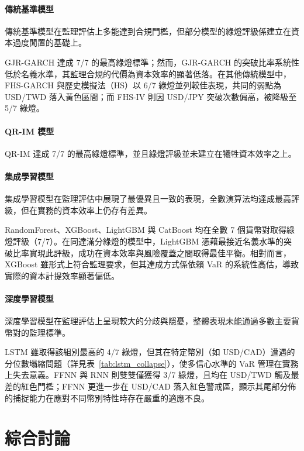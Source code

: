 \paragraph{傳統基準模型}

傳統基準模型在監理評估上多能達到合規門檻，但部分模型的綠燈評級係建立在資本過度閒置的基礎上。

GJR-GARCH 達成 7/7 的最高綠燈標準；然而，GJR-GARCH 的突破比率系統性低於名義水準，其監理合規的代價為資本效率的顯著低落。在其他傳統模型中，FHS-GARCH 與歷史模擬法（HS）以 6/7 綠燈並列較佳表現，共同的弱點為 USD/TWD 落入黃色區間；而 FHS-IV 則因 USD/JPY 突破次數偏高，被降級至 5/7 綠燈。

\paragraph{QR-IM 模型}

QR-IM 達成 7/7 的最高綠燈標準，並且綠燈評級並未建立在犧牲資本效率之上。

\paragraph{集成學習模型}

集成學習模型在監理評估中展現了最優異且一致的表現，全數演算法均達成最高評級，但在實務的資本效率上仍存有差異。

RandomForest、XGBoost、LightGBM 與 CatBoost 均在全數 7 個貨幣對取得綠燈評級（7/7）。在同達滿分綠燈的模型中，LightGBM 憑藉最接近名義水準的突破比率實現此評級，成功在資本效率與風險覆蓋之間取得最佳平衡。相對而言，XGBoost 雖形式上符合監理要求，但其達成方式係依賴 VaR 的系統性高估，導致實際的資本計提效率顯著偏低。

\paragraph{深度學習模型}

深度學習模型在監理評估上呈現較大的分歧與隱憂，整體表現未能通過多數主要貨幣對的監理標準。

LSTM 雖取得該組別最高的 4/7 綠燈，但其在特定幣別（如 USD/CAD）遭遇的分位數塌縮問題（詳見表~\ref{tab:lstm_collapse}），使多信心水準的 VaR 管理在實務上失去意義。FFNN 與 RNN 則雙雙僅獲得 3/7 綠燈，且均在 USD/TWD 觸及最差的紅色門檻；FFNN 更進一步在 USD/CAD 落入紅色警戒區，顯示其尾部分佈的捕捉能力在應對不同幣別特性時存在嚴重的適應不良。

\section{綜合討論}
\label{sec:comparison}

